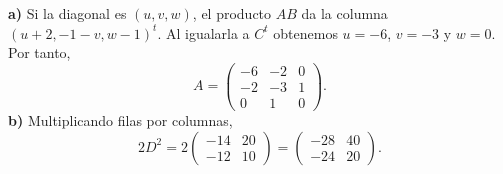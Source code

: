 \textbf{a)} Si la diagonal es $(u,v,w)$, el producto $AB$ da la columna $(u+2,-1-v,w-1)^t$. Al igualarla a $C^t$ obtenemos $u=-6$, $v=-3$ y $w=0$. Por tanto,
\[
A=\boxed{\begin{pmatrix}-6&-2&0\\-2&-3&1\\0&1&0\end{pmatrix}}.
\]
\textbf{b)} Multiplicando filas por columnas,
\[
2D^2=2\begin{pmatrix}-14&20\\-12&10\end{pmatrix}
=\boxed{\begin{pmatrix}-28&40\\-24&20\end{pmatrix}}.
\]
